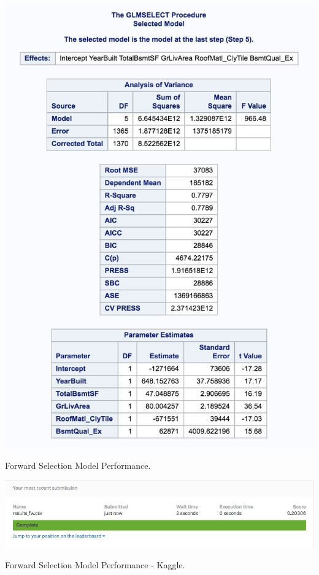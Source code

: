 \documentclass[11pt]{scrartcl} %
\begin{document}
\begin{table}[H] %
	\centering %
	\includegraphics[scale=.3]{../graphics/A2FWresults}
	\caption{Forward Selection Model Performance.} %
	\label{tab:A2FWperf}
\end{table}
\hrulefill
\begin{table}[H] %
	\centering %
	\includegraphics[scale=.4]{../graphics/A2FWKaggle}
	\caption{Forward Selection Model Performance - Kaggle.} %
	\label{tab:A2FWKaggle}
\end{table}
\end{document}
